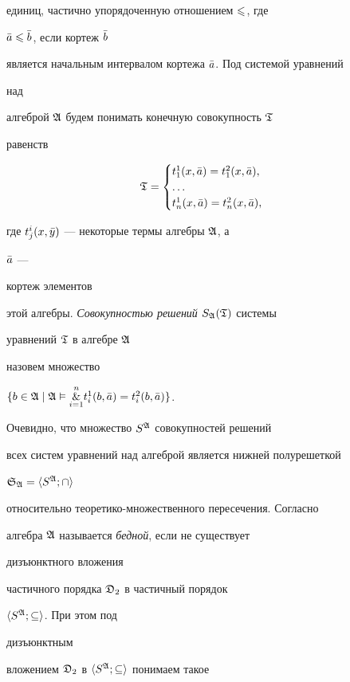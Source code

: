 единиц, частично упорядоченную отношением $\leqslant$, где


$\Bar a\leqslant\Bar b$, если кортеж $\Bar b$


является начальным интервалом кортежа $\Bar a$. Под системой уравнений


над


алгеброй $\frak A$ будем понимать конечную совокупность $\frak T$


равенств


$$


\frak T=


\begin{cases}


t^1_1(x,\Bar a)=t^2_1(x,\Bar a),\\


\dots \\


t^1_n(x,\Bar a)=t^2_n(x,\Bar a),


\end{cases}


$$


где $t^i_j(x,\Bar y)$ --- некоторые термы алгебры $\frak A$, а


$\Bar a$ ---


кортеж элементов


этой алгебры. {\it Совокупностью решений} $S_{\frak A}(\frak T)$ системы


уравнений $\frak T$ в алгебре $\frak A$


назовем множество


$\{b\in\frak A\mid\frak A\vDash\overset{n}{\underset{i=1}{\&}}{}


t^1_i(b,\Bar a)=t^2_i(b,\Bar a)\}$.


Очевидно, что множество $S^{\frak A}$ совокупностей решений


всех систем уравнений над алгеброй является нижней полурешеткой


$\frak S_{\frak A}=\langle S^{\frak A};\cap\rangle$


относительно теоретико-множественного пересечения. Согласно \cite{P7}


алгебра $\frak A$ называется {\it бедной}, если не существует


дизъюнктного вложения


частичного порядка $\frak D_2$ в частичный порядок


$\langle S^{\frak A};\subseteq\rangle$. При этом под


дизъюнктным


вложением $\frak D_2$ в $\langle S^{\frak A};\subseteq\rangle$ понимаем такое


